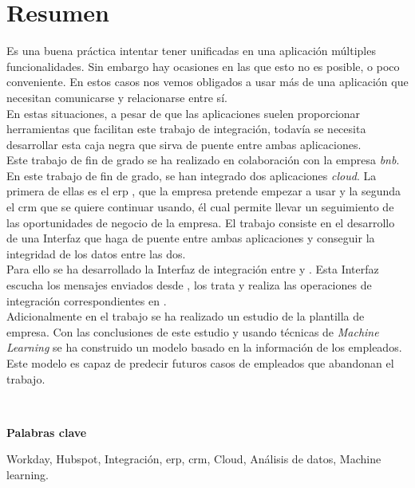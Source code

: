 \chapter*{Resumen}
	
	Es una buena práctica intentar tener unificadas en una aplicación múltiples funcionalidades.
	Sin embargo hay ocasiones en las que esto no es posible, o poco conveniente.
	En estos casos nos vemos obligados a usar más de una aplicación que necesitan comunicarse y relacionarse entre sí.\\
	
	En estas situaciones, a pesar de que las aplicaciones suelen proporcionar herramientas que facilitan este trabajo de integración, todavía se necesita desarrollar esta
	caja negra que sirva de puente entre ambas aplicaciones.\\
	
	Este trabajo de fin de grado se ha realizado en colaboración con la empresa \textit{\acrfull{bnb}}.
	En este trabajo de fin de grado, se han integrado dos aplicaciones \textit{cloud}. La primera de ellas es el \acrshort{erp} \wday{}, que la empresa pretende empezar a usar
	y la segunda el \acrshort{crm} \hs{} que se quiere continuar usando, él cual permite llevar un seguimiento de las oportunidades de negocio de la empresa.
	El trabajo consiste en el desarrollo de una Interfaz que haga de puente entre ambas aplicaciones y conseguir la integridad de los datos entre las dos. \\
	
	
	Para ello se ha desarrollado la Interfaz de integración entre \hs{} y \wday{}. Esta Interfaz escucha los mensajes enviados desde \hs{}, los trata y realiza las operaciones de integración correspondientes en \wday{}.\\

	
	
	Adicionalmente en el trabajo se ha realizado un estudio de la plantilla de empresa.
	Con las conclusiones de este estudio y usando técnicas de \textit{Machine Learning} se ha construido
	un modelo basado en la información de los empleados. Este modelo es capaz de predecir futuros casos de empleados que abandonan el trabajo.
	

	\
	
	\textbf{Palabras clave}
    
    Workday, Hubspot, Integración, \acrfull{erp}, \acrfull{crm}, Cloud, Análisis de datos, Machine learning.


